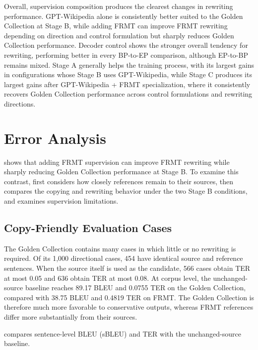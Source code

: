 Overall, supervision composition produces the clearest changes in rewriting
performance. GPT-Wikipedia alone is consistently better suited to the Golden
Collection at Stage B, while adding FRMT can improve FRMT rewriting depending
on direction and control formulation but sharply reduces Golden Collection
performance. Decoder control shows the stronger overall tendency for rewriting,
performing better in every BP-to-EP comparison, although EP-to-BP remains mixed.
Stage A generally helps the training process, with its largest gains in
configurations whose Stage B uses GPT-Wikipedia, while Stage C produces its largest gains after
GPT-Wikipedia + FRMT specialization, where it consistently recovers Golden
Collection performance across control formulations and rewriting directions.

\section{Error Analysis}
\label{sec:error-analysis}

 shows that adding FRMT supervision can improve FRMT
rewriting while sharply reducing Golden Collection performance at Stage B. To
examine this contrast,  first considers how closely
references remain to their sources,
 then compares the copying and rewriting
behavior under the two Stage B conditions, and
 examines supervision limitations.

\subsection{Copy-Friendly Evaluation Cases}
\label{sec:error-analysis-copy}

The Golden Collection contains many cases in which little or no rewriting is
required. Of its 1,000 directional cases, 454 have identical source and
reference sentences. When the source itself is used as the candidate, 566 cases
obtain TER at most 0.05 and 636 obtain TER at most 0.08. At corpus level, the
unchanged-source baseline reaches 89.17 BLEU and 0.0755 TER on the Golden
Collection, compared with 38.75 BLEU and 0.4819 TER on FRMT. The Golden
Collection is therefore much more favorable to conservative outputs, whereas
FRMT references differ more substantially from their sources.

 compares sentence-level BLEU (sBLEU)
and TER with the unchanged-source baseline.

